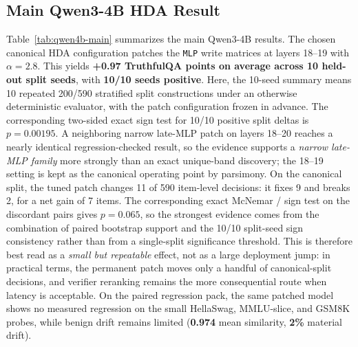 \documentclass{article}
\begin{document}
\subsection{Main Qwen3-4B HDA Result}
Table~\ref{tab:qwen4b-main} summarizes the main Qwen3-4B results. The chosen canonical HDA configuration patches the \texttt{MLP} write matrices at layers 18--19 with $\alpha=2.8$. This yields \textbf{+0.97 TruthfulQA points on average across 10 held-out split seeds}, with \textbf{10/10 seeds positive}. Here, the 10-seed summary means 10 repeated 200/590 stratified split constructions under an otherwise deterministic evaluator, with the patch configuration frozen in advance. The corresponding two-sided exact sign test for 10/10 positive split deltas is $p=0.00195$. A neighboring narrow late-MLP patch on layers 18--20 reaches a nearly identical regression-checked result, so the evidence supports a \emph{narrow late-MLP family} more strongly than an exact unique-band discovery; the 18--19 setting is kept as the canonical operating point by parsimony. On the canonical split, the tuned patch changes 11 of 590 item-level decisions: it fixes 9 and breaks 2, for a net gain of 7 items. The corresponding exact McNemar / sign test on the discordant pairs gives $p=0.065$, so the strongest evidence comes from the combination of paired bootstrap support and the 10/10 split-seed sign consistency rather than from a single-split significance threshold. This is therefore best read as a \emph{small but repeatable} effect, not as a large deployment jump: in practical terms, the permanent patch moves only a handful of canonical-split decisions, and verifier reranking remains the more consequential route when latency is acceptable. On the paired regression pack, the same patched model shows no measured regression on the small HellaSwag, MMLU-slice, and GSM8K probes, while benign drift remains limited (\textbf{0.974} mean similarity, \textbf{2\%} material drift).
\end{document}
